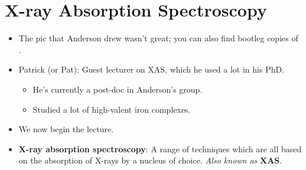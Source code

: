 \documentclass[../notes.tex]{subfiles}
\begin{document}
\section{X-ray Absorption Spectroscopy}
\begin{itemize}
    \item {}The pic that Anderson drew wasn't great; you can also find bootleg copies of \textcite{bib:Drago}.
    \item Patrick (or Pat): Guest lecturer on XAS, which he used a lot in his PhD.
    \begin{itemize}
        \item He's currently a post-doc in Anderson's group.
        \item Studied a lot of high-valent iron complexes.
    \end{itemize}
    \item We now begin the lecture.
    \item \textbf{X-ray absorption spectroscopy}: A range of techniques which are all based on the absorption of X-rays by a nucleus of choice. \emph{Also known as} \textbf{XAS}.
    \begin{figure}[h!]
        \centering
\end{figure}
\end{itemize}
\end{document}
